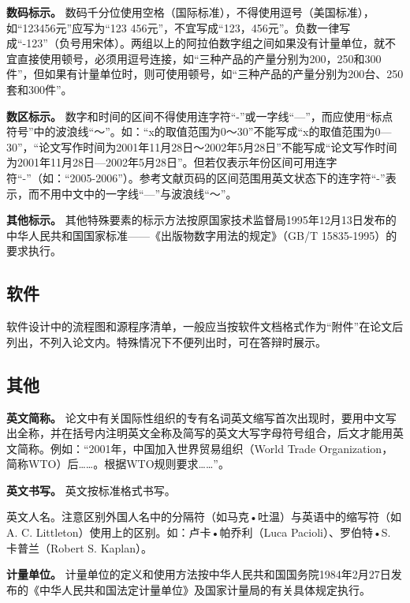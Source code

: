 \documentclass[doublesided]{Style/ucasthesis}%
\begin{document}
\textbf{数码标示。} 数码千分位使用空格（国际标准），不得使用逗号（美国标准），如``123456元''应写为``123 456元''，不宜写成``123，456元''。负数一律写成``-123''（负号用宋体）。两组以上的阿拉伯数字组之间如果没有计量单位，就不宜直接使用顿号，必须用逗号连接，如``三种产品的产量分别为200，250和300件''，但如果有计量单位时，则可使用顿号，如``三种产品的产量分别为200台、250套和300件''。

\textbf{数区标示。} 数字和时间的区间不得使用连字符``-''或一字线``---''，而应使用``标点符号''中的波浪线``～''。如：``x的取值范围为0～30''不能写成``x的取值范围为0---30''，``论文写作时间为2001年11月28日～2002年5月28日''不能写成``论文写作时间为2001年11月28日---2002年5月28日''。但若仅表示年份区间可用连字符``-''（如：``2005-2006''）。参考文献页码的区间范围用英文状态下的连字符``-''表示，而不用中文中的一字线``---''与波浪线``～''。

\textbf{其他标示。} 其他特殊要素的标示方法按原国家技术监督局1995年12月13日发布的中华人民共和国国家标准------《出版物数字用法的规定》（GB/T 15835-1995）的要求执行。

\hypertarget{section-30}{%
\subsection{软件}\label{section-30}}

软件设计中的流程图和源程序清单，一般应当按软件文档格式作为``附件''在论文后列出，不列入论文内。特殊情况下不便列出时，可在答辩时展示。

\hypertarget{section-31}{%
\subsection{其他}\label{section-31}}

\textbf{英文简称。} 论文中有关国际性组织的专有名词英文缩写首次出现时，要用中文写出全称，并在括号内注明英文全称及简写的英文大写字母符号组合，后文才能用英文简称。例如：``2001年，中国加入世界贸易组织（World Trade Organization，简称WTO）后\ldots{}\ldots{}。根据WTO规则要求\ldots{}\ldots{}''。

\textbf{英文书写。} 英文按标准格式书写。

英文人名。注意区别外国人名中的分隔符（如马克•吐温）与英语中的缩写符（如A. C. Littleton）使用上的区别。如：卢卡•帕乔利（Luca Pacioli）、罗伯特•S. 卡普兰（Robert S. Kaplan）。

\textbf{计量单位。} 计量单位的定义和使用方法按中华人民共和国国务院1984年2月27日发布的《中华人民共和国法定计量单位》及国家计量局的有关具体规定执行。
\end{document}
